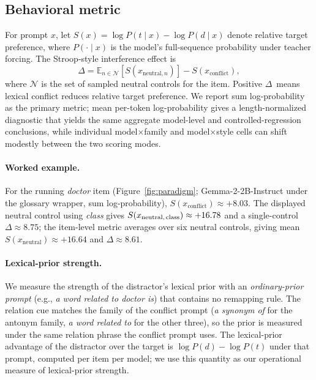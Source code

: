 \documentclass[11pt]{article}
\newcommand{\effect}{\ensuremath{\Delta}\xspace}
\begin{document}
\subsection{Behavioral metric}

For prompt $x$, let $S(x) = \log P(t \mid x) - \log P(d \mid x)$ denote relative target preference,
where $P(\cdot \mid x)$ is the model's full-sequence probability under teacher forcing.
The Stroop-style interference effect is
\[
\effect = \mathbb{E}_{n \in \mathcal{N}}\!\left[ S(x_{\text{neutral},n}) \right] - S(x_{\text{conflict}}),
\]
where $\mathcal{N}$ is the set of sampled neutral controls for the item.
Positive \effect~means lexical conflict reduces relative target preference.
We report sum log-probability as the primary metric; mean per-token log-probability gives a
length-normalized diagnostic that yields the same aggregate model-level and controlled-regression
conclusions, while individual model$\times$family and model$\times$style cells can shift modestly
between the two scoring modes.

\paragraph{Worked example.}
For the running \emph{doctor} item (Figure~\ref{fig:paradigm}; Gemma-2-2B-Instruct under the
glossary wrapper, sum log-probability), $S(x_{\text{conflict}}) \approx {+}8.03$. The displayed
neutral control using \emph{class} gives $S(x_{\text{neutral,\,class}}) \approx {+}16.78$ and
a single-control $\effect \approx 8.75$; the item-level metric averages over six neutral
controls, giving mean $S(x_{\text{neutral}}) \approx {+}16.64$ and $\effect \approx 8.61$.

\paragraph{Lexical-prior strength.}
We measure the strength of the distractor's lexical prior with an
\emph{ordinary-prior prompt} (e.g., \emph{a word related to doctor is}) that contains no
remapping rule. The relation cue matches the family of the conflict prompt (\emph{a synonym
of} for the antonym family, \emph{a word related to} for the other three), so the prior is
measured under the same relation phrase the conflict prompt uses. The lexical-prior advantage
of the distractor over the target is $\log P(d) - \log P(t)$ under that prompt, computed per
item per model; we use this quantity as our operational measure of lexical-prior strength.
\end{document}
